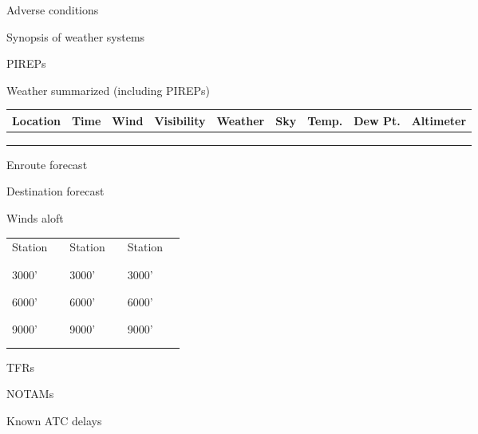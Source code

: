 \documentclass[10pt]{letter}
\newcommand{\luscore}[0]{\rule{3.75cm}{0.4pt}}
\newcommand{\wspace}[0]{\vspace{\stretch{1}}}
\renewcommand{\arraystretch}{1.75}
\begin{document}
\begin{flushleft}
Adverse conditions

\wspace
Synopsis of weather systems

\wspace
PIREPs

\wspace
\begin{center}Weather summarized (including PIREPs)\end{center}
\begin{footnotesize}
\begin{tabularx}{\textwidth}{|X|X|X|X|X|X|X|X|X|}
\hline\textbf{Location} & \textbf{Time} & \textbf{Wind} & \textbf{Visibility} & \textbf{Weather} & \textbf{Sky} & \textbf{Temp.} & \textbf{Dew Pt.} &\textbf{Altimeter}\\
\hline & & & & & & & &  \\
\hline & & & & & & & &  \\
\hline & & & & & & & &  \\\hline
\end{tabularx}

\end{footnotesize}



Enroute forecast

\wspace
Destination forecast

\wspace
\renewcommand{\arraystretch}{1.0} 
\begin{center}Winds aloft\end{center}
\begin{footnotesize}
\begin{tabularx}{\textwidth}{lc|lc|lc}
Station & \luscore & Station & \luscore & Station & \luscore \\
3000' & \luscore & 3000' & \luscore & 3000' & \luscore \\
6000' & \luscore & 6000' & \luscore & 6000' & \luscore \\
9000' & \luscore & 9000' & \luscore & 9000' & \luscore \\
\end{tabularx}
\end{footnotesize}


\wspace
TFRs

\wspace
NOTAMs

\wspace
Known ATC delays

\end{flushleft}
\end{document}
